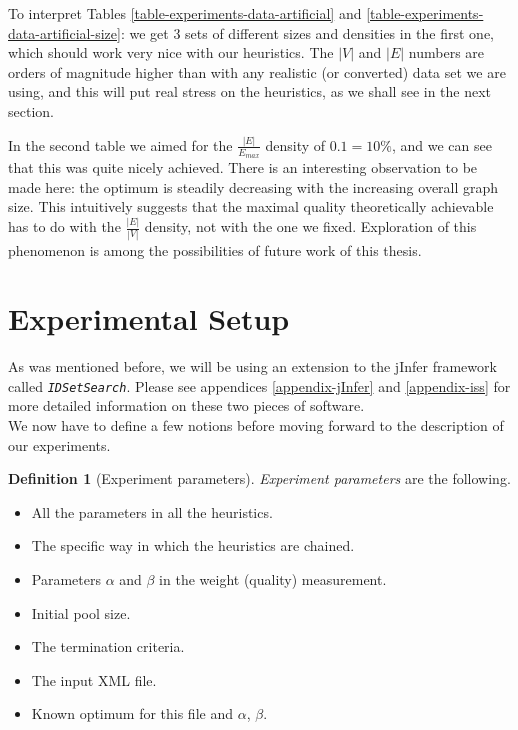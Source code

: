 \documentclass[a4paper,12pt,oneside]{report}
\newcommand{\jmodule}[1]{\texttt{\textit{#1}}}
\theoremstyle{definition}
\newtheorem{define}{Definition}[chapter]
\begin{document}
To interpret Tables \ref{table-experiments-data-artificial} and \ref{table-experiments-data-artificial-size}: we get 3 sets of different sizes and densities in the first one, which should work very nice with our heuristics. The $|V|$ and $|E|$ numbers are orders of magnitude higher than with any realistic (or converted) data set we are using, and this will put real stress on the heuristics, as we shall see in the next section.

In the second table we aimed for the $\frac{|E|}{E_{max}}$ density of $0.1 = 10\%$, and we can see that this was quite nicely achieved. There is an interesting observation to be made here: the optimum is steadily decreasing with the increasing overall graph size. This intuitively suggests that the maximal quality theoretically achievable has to do with the $\frac{|E|}{|V|}$ density, not with the one we fixed. Exploration of this phenomenon is among the possibilities of future work of this thesis.

\section{Experimental Setup}

As was mentioned before, we will be using an extension to the jInfer framework called \jmodule{IDSetSearch}. Please see appendices \ref{appendix-jInfer} and \ref{appendix-iss} for more detailed information on these two pieces of software.\\

We now have to define a few notions before moving forward to the description of our experiments.

\begin{define}[Experiment parameters]
	\label{define-experiment-params}
	\textit{Experiment parameters} are the following.
	\begin{itemize}
		\item All the parameters in all the heuristics.
		\item The specific way in which the heuristics are chained.
		\item Parameters $\alpha$ and $\beta$ in the weight (quality) measurement.
		\item Initial pool size.
		\item The termination criteria.
		\item The input XML file.
		\item Known optimum for this file and $\alpha$, $\beta$.
	\end{itemize}
\end{define}
\end{document}
